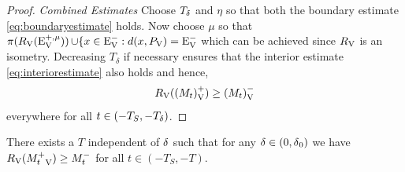 \documentclass{amsart}
\begin{document}
\begin{proof}
\emph{Combined Estimates}
Choose \(T_{\operatorname{\delta}}\) and \(\eta\) so that both the boundary estimate \cref{eq:boundaryestimate} holds. Now choose \(\mu\) so that \(\operatorname{\pi}(R_{\operatorname{V}}({\operatorname{E}}_{\operatorname{V}}^{+,\mu})) \operatorname{\cup} \{x \in {\operatorname{E}}_{\operatorname{V}}^- : d(x, P_{\operatorname{V}}) = {\operatorname{E}}_{\operatorname{V}}^-\) which can be achieved since \(R_{\operatorname{V}}\) is an isometry. Decreasing \(T_{\delta}\) if necessary ensures that the interior estimate \cref{eq:interiorestimate} also holds and hence,
\[
R_{\operatorname{V}}({(M_t)}_{\operatorname{V}}^+) \geq {(M_t)}_{\operatorname{V}}^-
\]
everywhere for all \(t \in (-T_S, -T_{\operatorname{\delta}})\).
\end{proof}

\begin{lemma}
\label{lem:approximate_symmetrypreserved}
There exists a \(T\) independent of \(\operatorname{\delta}\) such that for any \(\operatorname{\delta} \in (0,\operatorname{\delta}_0)\) we have \(R_{\operatorname{V}}({M_t^+}_{\operatorname{V}}) \geq M_t^-\) for all \(t \in (-T_S, -T)\).
\end{lemma}
\end{document}
